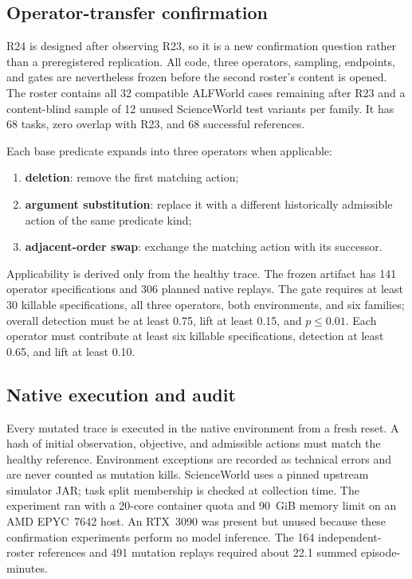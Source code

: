 \documentclass[10pt]{article}
\begin{document}
\subsection{Operator-transfer confirmation}
R24 is designed after observing R23, so it is a new confirmation question rather than a preregistered replication. All code, three operators, sampling, endpoints, and gates are nevertheless frozen before the second roster's content is opened. The roster contains all 32 compatible ALFWorld cases remaining after R23 and a content-blind sample of 12 unused ScienceWorld test variants per family. It has 68 tasks, zero overlap with R23, and 68 successful references.

Each base predicate expands into three operators when applicable:
\begin{enumerate}
  \item \textbf{deletion}: remove the first matching action;
  \item \textbf{argument substitution}: replace it with a different historically admissible action of the same predicate kind;
  \item \textbf{adjacent-order swap}: exchange the matching action with its successor.
\end{enumerate}
Applicability is derived only from the healthy trace. The frozen artifact has 141 operator specifications and 306 planned native replays. The gate requires at least 30 killable specifications, all three operators, both environments, and six families; overall detection must be at least 0.75, lift at least 0.15, and $p\leq0.01$. Each operator must contribute at least six killable specifications, detection at least 0.65, and lift at least 0.10.

\subsection{Native execution and audit}
Every mutated trace is executed in the native environment from a fresh reset. A hash of initial observation, objective, and admissible actions must match the healthy reference. Environment exceptions are recorded as technical errors and are never counted as mutation kills. ScienceWorld uses a pinned upstream simulator JAR; task split membership is checked at collection time. The experiment ran with a 20-core container quota and 90~GiB memory limit on an AMD EPYC~7642 host. An RTX~3090 was present but unused because these confirmation experiments perform no model inference. The 164 independent-roster references and 491 mutation replays required about 22.1 summed episode-minutes.
\end{document}
